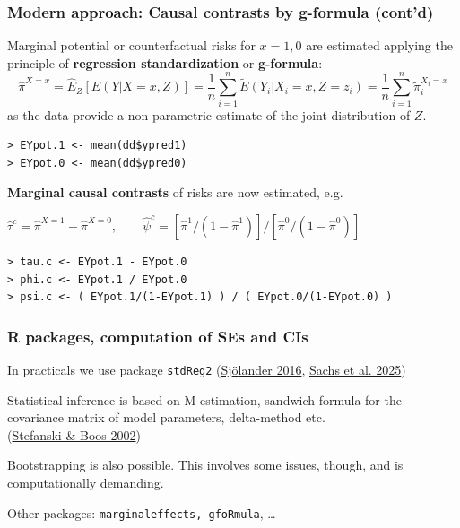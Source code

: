 \documentclass[12pt,dvipsnames,t,aspectratio=169, handout%
]{beamer}
\begin{document}
\begin{frame}[fragile]
\frametitle{\large Modern approach: Causal contrasts by g-formula (cont'd)}
\bi
\item
Marginal potential or counterfactual risks for $x=1,0$ are estimated applying
the principle of {\bf regression standardization} or {\bf g-formula}:
$$ \widehat{\pi}^{X=x} = \widehat{E}_Z[E(Y|X=x, Z)]  = \frac{1}{n} \sum_{i=1}^n \widetilde{E}(Y_i|X_i=x, Z=z_i) 
= \frac{1}{n} \sum_{i=1}^n \widetilde{\pi}_i^{X_i=x}
$$
as the data provide a non-parametric estimate of the joint distribution of $Z$.
\pause
{\small\color{blue}
\begin{verbatim}
> EYpot.1 <- mean(dd$ypred1)
> EYpot.0 <- mean(dd$ypred0)
\end{verbatim}
}
\medskip
\item
\textbf{Marginal causal contrasts} of risks are now estimated, e.g.
\begin{center}
$ \widehat\tau^c = \widehat{\pi}^{X=1} - \widehat{\pi}^{X=0}, \qquad 
	 \widehat\psi^c = [ \widehat{\pi}^{1}/(1-  \widehat{\pi}^{1})]/ [ \widehat{\pi}^{0}/(1- \widehat{\pi}^{0})] $
\end{center}
\medskip
{\small\color{blue}
\begin{verbatim}
> tau.c <- EYpot.1 - EYpot.0
> phi.c <- EYpot.1 / EYpot.0
> psi.c <- ( EYpot.1/(1-EYpot.1) ) / ( EYpot.0/(1-EYpot.0) )  
\end{verbatim}
}

\ei
\end{frame}

\begin{frame}
\frametitle{\large R packages, computation of SEs and CIs}
\bi
\item
In practicals we use package {\tt stdReg2} 
{\small(\href{https://doi.org/10.1007/s10654-016-0157-3}{\color{blue}Sj{\"o}lander 2016}, 
 \href{https://doi.org/10.1016/j.annepidem.2025.04.002}{\color{blue}Sachs et al. 2025})}
\medskip
\item
Statistical inference is based on M-estimation, sandwich formula
for the covariance matrix of model parameters, delta-method etc. \\
{\small (\href{https://www.jstor.org/stable/3087324}{\color{blue}Stefanski \& Boos 2002})} 
\medskip
\item  
Bootstrapping is also possible. This involves some issues, though, and is 
computationally demanding.
\medskip
\item Other packages: {\tt marginaleffects, gfoRmula}, \dots 
\ei
\end{frame}
\end{document}
